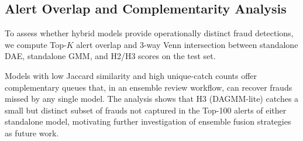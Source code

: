 \subsection{Alert Overlap and Complementarity Analysis}
\label{sec:p2_overlap}

To assess whether hybrid models provide operationally distinct fraud detections, we compute Top-$K$ alert overlap and 3-way Venn intersection between standalone DAE, standalone GMM, and H2/H3 scores on the test set.

Models with low Jaccard similarity and high unique-catch counts offer complementary queues that, in an ensemble review workflow, can recover frauds missed by any single model. The analysis shows that H3 (DAGMM-lite) catches a small but distinct subset of frauds not captured in the Top-100 alerts of either standalone model, motivating further investigation of ensemble fusion strategies as future work.
